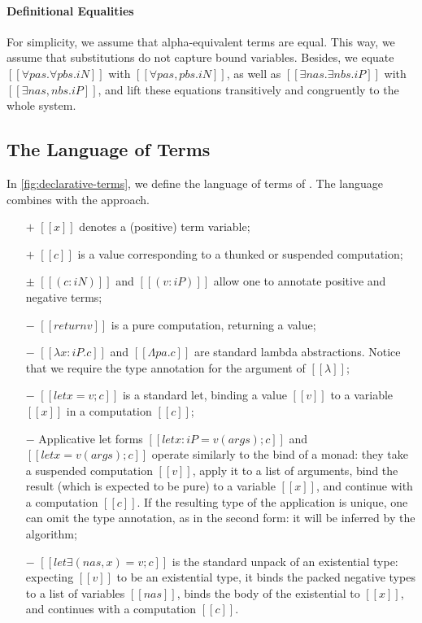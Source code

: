 \paragraph{Definitional Equalities}
For simplicity, we assume that alpha-equivalent terms are equal.
This way, we assume that substitutions do not capture bound variables.
Besides, we equate
$[[∀pas.∀pbs.iN]]$ with $[[∀pas,pbs.iN]]$, 
as well as $[[∃nas.∃nbs.iP]]$ with $[[∃nas,nbs.iP]]$,
and lift these equations transitively and congruently 
to the whole system.

\subsection{The Language of Terms}

In \cref{fig:declarative-terms}, we define the language of terms of 
\fexists. The language combines \systemf with the \CBPV approach.

\begin{itemize}
    \item [$+$] $[[x]]$ denotes a (positive) term variable; 
    \item [$+$] $[[{c}]]$ is a value corresponding to a thunked 
        or suspended computation;
    \item [$\pm$] $[[(c : iN)]]$ and $[[(v : iP)]]$ allow one to annotate 
        positive and negative terms;
    \item [$-$] $[[return v]]$ is a pure computation, returning a value;
    \item [$-$] $[[λ x : iP . c]]$ and $[[Λ pa . c]]$
        are standard lambda abstractions. Notice that we require
        the type annotation for the argument of $[[λ]]$;
    \item [$-$] $[[ let x = v ; c]]$ is a standard let, binding
        a value $[[v]]$ to a variable $[[x]]$ in a computation $[[c]]$;
    \item [$-$] Applicative let forms $[[let x : iP = v ( args ) ; c]]$ and
        $[[let x = v ( args ) ; c]]$ operate similarly to 
        the bind of a monad: they take a suspended computation $[[v]]$,
        apply it to a list of arguments, bind the result 
        (which is expected to be pure) to a variable $[[x]]$,
        and continue with a computation $[[c]]$.
        If the resulting type of the application is unique, 
        one can omit the type annotation, as in the second form:
        it will be inferred by the algorithm;
    \item [$-$] $[[let∃ ( nas , x ) = v ; c]]$
        is the standard unpack of an existential type:
        expecting $[[v]]$ to be an existential type,
        it binds the packed negative types to a list of 
        variables $[[nas]]$, binds the body of the existential
        to $[[x]]$, and continues with a computation $[[c]]$.
\end{itemize}

